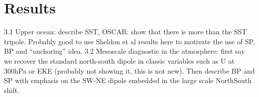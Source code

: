 






\section{Results}


3.1 Upper ocean: describe SST, OSCAR: show that there is more than the SST tripole. Probably good to use Sheldon et al results here to motivate the use of SP, BP and “anchoring” idea.
3.2 Mesoscale diagnostic in the atmosphere: first say we recover the standard north-south dipole in classic variables such as U at 300hPa or EKE (probably not showing it, this is not new). Then describe BP and SP with emphasis on the SW-NE dipole embedded in the large scale NorthSouth shift.

